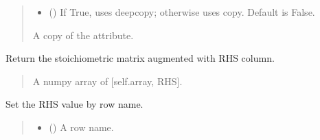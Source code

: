 \documentclass[letterpaper,12pt,english]{sphinxmanual}
\begin{document}
\begin{fulllineitems}
\begin{fulllineitems}
\begin{quote}
\begin{description}
\begin{itemize}
\item {} 
\sphinxAtStartPar
{} (\sphinxstyleliteralemphasis{\sphinxupquote{, }}) \textendash{} If True, uses deepcopy; otherwise uses copy. Default is False.

\end{itemize}

\sphinxAtStartPar
{} \textendash{} A copy of the attribute.

\end{description}\end{quote}

\end{fulllineitems}


\begin{fulllineitems}
\label{\detokenize{api/core:cbmpy.CBCommon.StructMatrixLP.getLandRHS}}
\pysigstartsignatures
\pysiglinewithargsret
{}
{}
{}
\pysigstopsignatures
\sphinxAtStartPar
Return the stoichiometric matrix augmented with RHS column.
\begin{quote}\begin{description}
\sphinxAtStartPar
{} \textendash{} A numpy array of {[}self.array, RHS{]}.

\end{description}\end{quote}

\end{fulllineitems}


\begin{fulllineitems}
\label{\detokenize{api/core:cbmpy.CBCommon.StructMatrixLP.setRHSbyName}}
\pysigstartsignatures
\pysiglinewithargsret
{}
{\sphinxparamcomma {}}
{}
\pysigstopsignatures
\sphinxAtStartPar
Set the RHS value by row name.
\begin{quote}\begin{description}
\begin{itemize}
\item {} 
\sphinxAtStartPar
{} () \textendash{} A row name.


\end{itemize}
\end{description}
\end{quote}
\end{fulllineitems}
\end{fulllineitems}
\end{document}
